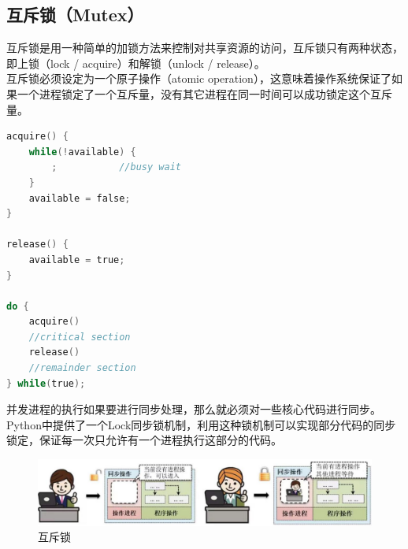 \vspace{0.5cm}

\subsection{互斥锁（Mutex）}

互斥锁是用一种简单的加锁方法来控制对共享资源的访问，互斥锁只有两种状态，即上锁（lock / acquire）和解锁（unlock / release）。\\

互斥锁必须设定为一个原子操作（atomic operation），这意味着操作系统保证了如果一个进程锁定了一个互斥量，没有其它进程在同一时间可以成功锁定这个互斥量。\\


\begin{lstlisting}[language=C]
acquire() {
	while(!available) {
		;			//busy wait
	}
	available = false;
}

release() {
	available = true;
}

do {
	acquire()
	//critical section
	release()
	//remainder section
} while(true);
\end{lstlisting}

并发进程的执行如果要进行同步处理，那么就必须对一些核心代码进行同步。Python中提供了一个Lock同步锁机制，利用这种锁机制可以实现部分代码的同步锁定，保证每一次只允许有一个进程执行这部分的代码。

\begin{figure}[H]
    \centering
    \includegraphics[]{img/C2/2-6/1.png}
    \caption{互斥锁}
\end{figure}


